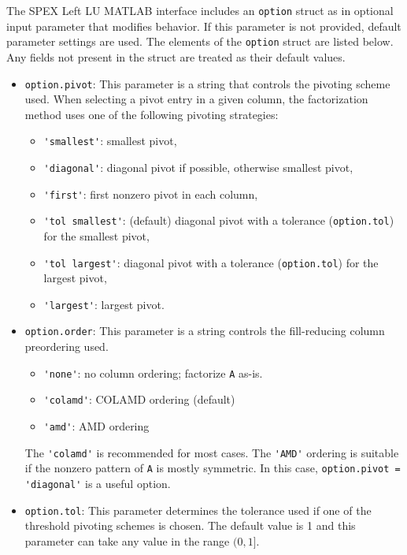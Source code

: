 \documentclass[12pt]{report}
\theoremstyle{definition}
\begin{document}
The SPEX Left LU MATLAB interface includes an \verb|option| struct as in optional
input parameter that modifies behavior.  If this parameter is not provided,
default parameter settings are used.  The elements of the \verb'option' struct
are listed below.  Any fields not present in the struct are treated as their
default values.

\begin{itemize}

\item \verb|option.pivot|: This parameter is a string that controls the
pivoting scheme used.  When selecting a pivot entry in a given column, the
factorization method uses one of the following pivoting strategies:

    \begin{itemize}
    \item \verb|'smallest'|: smallest pivot,
    \item \verb|'diagonal'|: diagonal pivot if possible, otherwise smallest pivot,
    \item \verb|'first'|: first nonzero pivot in each column,
    \item \verb|'tol smallest'|: (default) diagonal pivot with a tolerance (\verb|option.tol|)
        for the smallest pivot,
    \item \verb|'tol largest'|: diagonal pivot with a tolerance (\verb|option.tol|)
        for the largest pivot,
    \item \verb|'largest'|: largest pivot.
    \end{itemize}

\item \verb|option.order|: This parameter is a string controls the
fill-reducing column preordering used.

    \begin{itemize}
    \item \verb|'none'|: no column ordering; factorize \verb'A' as-is.
    \item \verb|'colamd'|: COLAMD ordering (default)
    \item \verb|'amd'|: AMD ordering
    \end{itemize}

The \verb|'colamd'| is recommended for most cases.  The \verb|'AMD'| ordering
is suitable if the nonzero pattern of \verb'A' is mostly symmetric.  In this
case, \verb|option.pivot = 'diagonal'| is a useful option.

\item \verb|option.tol|: This parameter determines the tolerance used if one of
the threshold pivoting schemes is chosen. The default value is 1 and this
parameter can take any value in the range $(0,1]$.


\end{itemize}
\end{document}
